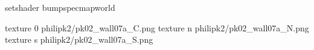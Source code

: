 setshader bumpspecmapworld

texture 0 philipk2/pk02_wall07a_C.png
texture n philipk2/pk02_wall07a_N.png
texture s philipk2/pk02_wall07a_S.png

